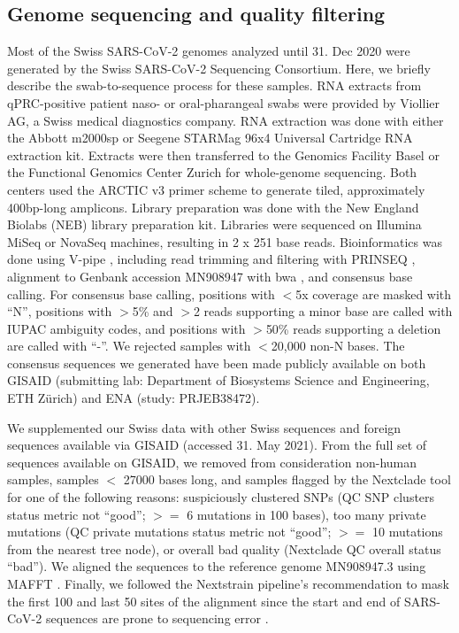\documentclass[9pt,twoside,lineno]{pnas-new} %
\begin{document}
\subsection*{Genome sequencing and quality filtering}
Most of the Swiss SARS-CoV-2 genomes analyzed until 31. Dec 2020 were generated by the Swiss SARS-CoV-2 Sequencing Consortium. Here, we briefly describe the swab-to-sequence process for these samples. RNA extracts from qPRC-positive patient naso- or oral-pharangeal swabs were provided by Viollier AG, a Swiss medical diagnostics company. RNA extraction was done with either the Abbott m2000sp or Seegene STARMag 96x4 Universal Cartridge RNA extraction kit. Extracts were then  transferred to the Genomics Facility Basel or the Functional Genomics Center Zurich for whole-genome sequencing. Both centers used the ARCTIC v3 primer scheme \cite{Quick2017, ARCTICNetwork} to generate tiled, approximately 400bp-long amplicons. Library preparation was done with the New England Biolabs (NEB) library preparation kit. Libraries were sequenced on Illumina MiSeq or NovaSeq machines, resulting in 2 x 251 base reads. Bioinformatics was done using V-pipe \cite{Posada-Cespedes2020}, including read trimming and filtering with PRINSEQ \cite{Schmieder2011}, alignment to Genbank accession MN908947 \cite{Wu2020} with bwa \cite{Li2009}, and consensus base calling. For consensus base calling, positions with $<$5x coverage are masked with ``N'', positions with $>$5\% and $>$2 reads supporting a minor base are called with IUPAC ambiguity codes, and positions with $>$50\% reads supporting a deletion are called with ``-''. We rejected samples with $<$20,000 non-N bases. The consensus sequences we generated have been made publicly available on both GISAID (submitting lab: Department of Biosystems Science and Engineering, ETH Zürich) and ENA (study: PRJEB38472).

We supplemented our Swiss data with other Swiss sequences and foreign sequences available via GISAID (accessed 31. May 2021). From the full set of sequences available on GISAID, we removed from consideration non-human samples, samples $<$ 27000 bases long, and samples flagged by the Nextclade tool \cite{Aksamentov} for one of the following reasons: suspiciously clustered SNPs (QC SNP clusters status metric not ``good''; $>=$ 6 mutations in 100 bases), too many private mutations (QC private mutations status metric not ``good''; $>=$ 10 mutations from the nearest tree node), or overall bad quality (Nextclade QC overall status ``bad''). We aligned the sequences to the reference genome MN908947.3 using MAFFT \cite{katoh_mafft:_2002}. Finally, we followed the Nextstrain pipeline's recommendation to mask the first 100 and last 50 sites of the alignment \cite{Nextstraina} since the start and end of SARS-CoV-2 sequences are prone to sequencing error \cite{DeMaio2020}.
\end{document}
